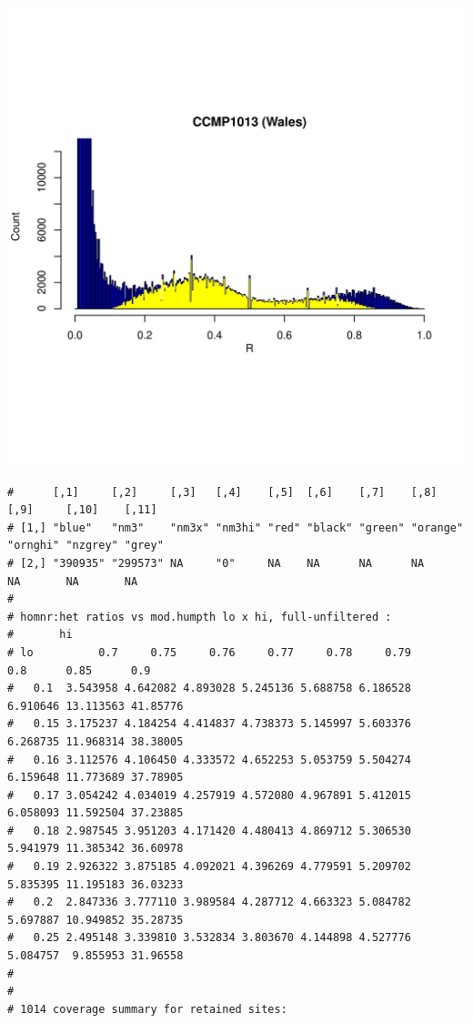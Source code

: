 \documentclass{article}\usepackage[]{graphicx}\usepackage[]{color}
\makeatletter
\def\maxwidth{ %
  \ifdim\Gin@nat@width>\linewidth
    \linewidth
  \else
    \Gin@nat@width
  \fi
}
\newenvironment{kframe}{%
 \def\at@end@of@kframe{}%
 \ifinner\ifhmode%
  \def\at@end@of@kframe{\end{minipage}}%
  \begin{minipage}{\columnwidth}%
 \fi\fi%
 \def\FrameCommand##1{\hskip\@totalleftmargin \hskip-\fboxsep
 \colorbox{shadecolor}{##1}\hskip-\fboxsep
     \hskip-\linewidth \hskip-\@totalleftmargin \hskip\columnwidth}%
 \MakeFramed {\advance\hsize-\width
   \@totalleftmargin\z@ \linewidth\hsize
   \@setminipage}}%
 {\par\unskip\endMakeFramed%
 \at@end@of@kframe}
\newenvironment{knitrout}{}{} %
\makeatother
\begin{document}
\begin{knitrout}
\includegraphics[width=\maxwidth]{FigS7-hwe-histo-figs-knitr/unnamed-chunk-10-5} 
\begin{kframe}\begin{verbatim}
#      [,1]     [,2]     [,3]   [,4]    [,5]  [,6]    [,7]    [,8]     [,9]     [,10]    [,11] 
# [1,] "blue"   "nm3"    "nm3x" "nm3hi" "red" "black" "green" "orange" "ornghi" "nzgrey" "grey"
# [2,] "390935" "299573" NA     "0"     NA    NA      NA      NA       NA       NA       NA
# 
# homnr:het ratios vs mod.humpth lo x hi, full-unfiltered :
#       hi
# lo          0.7     0.75     0.76     0.77     0.78     0.79      0.8      0.85      0.9
#   0.1  3.543958 4.642082 4.893028 5.245136 5.688758 6.186528 6.910646 13.113563 41.85776
#   0.15 3.175237 4.184254 4.414837 4.738373 5.145997 5.603376 6.268735 11.968314 38.38005
#   0.16 3.112576 4.106450 4.333572 4.652253 5.053759 5.504274 6.159648 11.773689 37.78905
#   0.17 3.054242 4.034019 4.257919 4.572080 4.967891 5.412015 6.058093 11.592504 37.23885
#   0.18 2.987545 3.951203 4.171420 4.480413 4.869712 5.306530 5.941979 11.385342 36.60978
#   0.19 2.926322 3.875185 4.092021 4.396269 4.779591 5.209702 5.835395 11.195183 36.03233
#   0.2  2.847336 3.777110 3.989584 4.287712 4.663323 5.084782 5.697887 10.949852 35.28735
#   0.25 2.495148 3.339810 3.532834 3.803670 4.144898 4.527776 5.084757  9.855953 31.96558
# 
# 
# 1014 coverage summary for retained sites:

\end{verbatim}
\end{kframe}
\end{knitrout}
\end{document}
